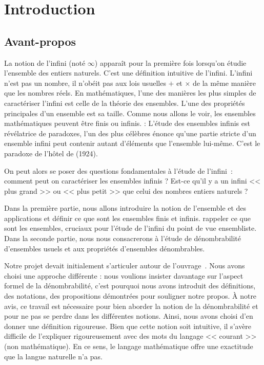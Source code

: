 \documentclass[a4paper,french,final]{memoir}
\begin{document}
\begin{titlingpage}

\end{titlingpage}
\hypersetup{pageanchor=true}
\frontmatter
\tableofcontents
\part{Introduction}
\chapter{Avant-propos}

La notion de l'infini (noté $\infty$) apparaît pour la première fois lorsqu'on étudie l'ensemble des entiers naturels. C'est une définition intuitive de l'infini. L'infini n'est pas un nombre, il n'obéit pas aux lois usuelles $+$ et $\times$ de la même manière que les nombres réels. En mathématiques, l'une des manières les plus simples de caractériser l'infini est celle de la théorie des ensembles. L'une des propriétés principales d'un ensemble est sa taille. Comme nous allons le voir, les ensembles mathématiques peuvent être finis ou infinis. : L'étude des ensembles infinis est révélatrice de paradoxes, l'un des plus célèbres  énonce qu'une partie stricte d'un ensemble infini peut contenir autant d'éléments que l'ensemble lui-même. C'est le paradoxe de l'hôtel de  (1924).

On peut alors se poser des questions fondamentales à l'étude de l'infini~: comment peut on caractériser les ensembles infinis ? Est-ce qu'il y a un infini << plus grand >> ou << plus petit >> que celui des nombres entiers naturels ?

Dans la première partie, nous allons introduire la notion de l'ensemble et des applications et définir ce que sont les ensembles finis et infinis. rappeler ce que sont les ensembles, cruciaux pour l'étude de l'infini du point de vue ensembliste.
Dans la seconde partie, nous nous consacrerons à l'étude de dénombrabilité d'ensembles usuels et aux propriétés d'ensembles dénombrables.

Notre projet devait initialement s'articuler autour de l'ouvrage~\cite{livre_ter}. Nous avons choisi une approche différente : nous voulions insister davantage sur l'aspect formel de la dénombrabilité, c'est pourquoi nous avons introduit des définitions, des notations, des propositions démontrées pour souligner notre propos. \`A notre avis, ce travail est nécessaire pour bien aborder la notion de la dénombrabilité et pour ne pas se perdre dans les différentes notions. Ainsi, nous avons choisi d'en donner une définition rigoureuse. Bien que cette notion soit intuitive, il s'avère difficile de l'expliquer rigoureusement avec des mots du langage << courant >> (non mathématique). En ce sens, le langage mathématique offre une exactitude que la langue naturelle n'a pas.
\end{document}
